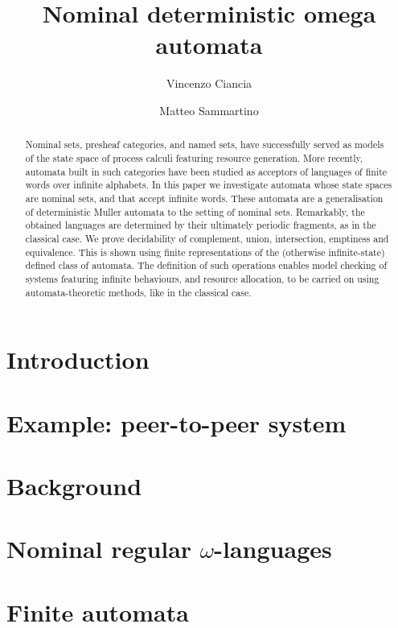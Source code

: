\documentclass[orivec]{llncs}
\title{Nominal deterministic omega automata}
\author{Vincenzo Ciancia\inst{1} \and Matteo Sammartino\inst{2}}
\institute{ISTI-CNR, Pisa \and Dipartimento di Informatica, Universit\`a di Pisa, Pisa }
\begin{document}
\maketitle

\begin{abstract}
  Nominal sets, presheaf categories, and named sets, have successfully served as models of the state space of process calculi featuring resource generation. More recently, automata built in such categories have been studied as acceptors of languages of finite words over infinite alphabets. In this paper we investigate automata whose state spaces are nominal sets, and that accept infinite words. These automata are a generalisation of deterministic Muller automata to the setting of nominal sets. Remarkably, the obtained languages are determined by their ultimately periodic fragments, as in the classical case. We prove decidability of complement, union, intersection, emptiness and equivalence. This is shown using finite representations of the (otherwise infinite-state) defined class of automata. The definition of such operations enables model checking of systems featuring infinite behaviours, and resource allocation, to be carried on using automata-theoretic methods, like in the classical case.
\end{abstract}

\section{Introduction}\label{sec:introduction}

\section{Example: peer-to-peer system}\label{sec:example}


\section{Background}\label{sec:background}

\section{Nominal regular $\omega$-languages}\label{sec:languages}


\section{Finite automata}\label{sec:hd-automata}

\end{document}
